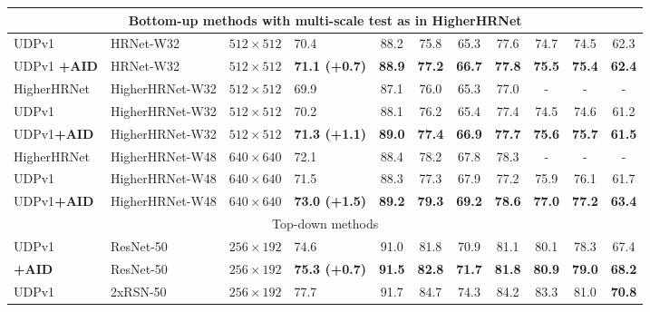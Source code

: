 \documentclass[final]{cvpr}
\begin{document}
\begin{table*}
\begin{center}
\begin{tabular}{l|l|c|lccccccc}
\hline
\multicolumn{11}{c}{Bottom-up methods with multi-scale test as in HigherHRNet \cite{Higher}}\\
\hline
UDPv1 \cite{UDP}         & HRNet-W32     &$512\times512$    &70.4                 & 88.2          & 75.8          & 65.3          &77.6           &74.7          &74.5              &62.3\\
UDPv1 \textbf{+AID}      & HRNet-W32     &$512\times512$    &\textbf{71.1 (+0.7)}  &\textbf{88.9}  &\textbf{77.2}  &\textbf{66.7}  &\textbf{77.8}  &\textbf{75.5} &\textbf{75.4}  &\textbf{62.4}\\
HigherHRNet \cite{Higher}& HigherHRNet-W32&$512\times512$   &69.9                 & 87.1          & 76.0          & 65.3          &77.0           & -            &-              &-   \\
UDPv1 \cite{UDP}         & HigherHRNet-W32&$512\times512$   &70.2                 & 88.1          & 76.2          & 65.4          &77.4           &74.5          &74.6           &61.2\\
UDPv1\textbf{+AID}      & HigherHRNet-W32&$512\times512$   &\textbf{71.3 (+1.1)}  &\textbf{89.0}  &\textbf{77.4}  &\textbf{66.9}  &\textbf{77.7}  &\textbf{75.6} &\textbf{75.7}  &\textbf{61.5}\\
HigherHRNet \cite{Higher}& HigherHRNet-W48&$640\times640$   &72.1                 & 88.4          & 78.2          & 67.8          &78.3           & -            &-              &-   \\
UDPv1 \cite{UDP}         & HigherHRNet-W48&$640\times640$   &71.5                 & 88.3          & 77.3          & 67.9          &77.2           &75.9          &76.1           &61.7\\
UDPv1\textbf{+AID}      & HigherHRNet-W48&$640\times640$   &\textbf{73.0 (+1.5)}  &\textbf{89.2}  &\textbf{79.3}  &\textbf{69.2}  &\textbf{78.6}  &\textbf{77.0} &\textbf{77.2}  &\textbf{63.4}\\
\hline
\multicolumn{11}{c}{Top-down methods}\\
\hline
UDPv1 \cite{UDP}         & ResNet-50     &$256\times192$    &74.6                 & 91.0          & 81.8          & 70.9          &81.1           &80.1          &78.3           &67.4\\
\textbf{+AID}            & ResNet-50     &$256\times192$    &\textbf{75.3 (+0.7)}  &\textbf{91.5}  &\textbf{82.8}  &\textbf{71.7}  &\textbf{81.8}  &\textbf{80.9} &\textbf{79.0}  &\textbf{68.2}\\
UDPv1 \cite{UDP}         & 2xRSN-50      &$256\times192$    &77.7                 & 91.7          & 84.7          & 74.3          &84.2           &83.3          &81.0           &\textbf{70.8}\\

\end{tabular}
\end{center}
\end{table*}
\end{document}
